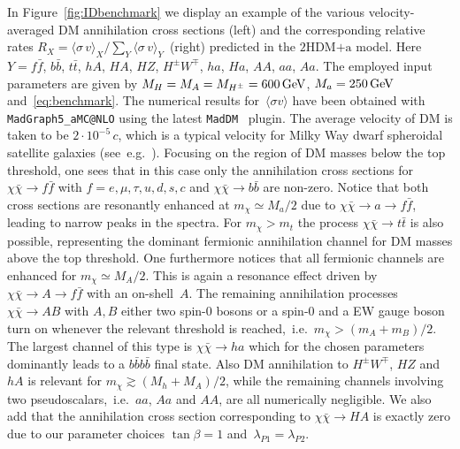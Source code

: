 \documentclass[a4paper, 11pt,notoc]{article}
\newcommand{\hdma}{\ensuremath{\textrm{2HDM+a}}\xspace}
\begin{document}
In  Figure~\ref{fig:IDbenchmark} we display  an example of the various velocity-averaged DM annihilation cross sections (left) and the corresponding relative rates $R_X = \langle \sigma \, v \rangle_X/\sum_Y \langle \sigma \, v \rangle_Y$~(right) predicted  in the \hdma model. Here $Y =  f \bar f$, $b \bar b$, $t \bar t$,  $hA$, $HA$, $HZ$,  $H^\pm W^\mp$, $ha$, $Ha$, $AA$, $aa$, $Aa$. The employed input parameters are given by $M_H = M_A = M_{H^\pm} = 600 \, {\rm GeV}$, $M_a = 250 \, {\rm GeV}$ and~\eqref{eq:benchmark}. The numerical results for~$\langle \sigma v \rangle$ have been obtained with {\tt MadGraph5\_aMC@NLO}  using the latest  {\tt MadDM}~\cite{Ambrogi:2018jqj} plugin.  The average velocity of DM is taken to be $2 \cdot 10^{-5} \, c$, which is a typical velocity for Milky Way dwarf spheroidal satellite galaxies (see~e.g.~\cite{Simon:2007dq,Walker:2008ax}). Focusing on the region of DM masses below the top threshold, one sees that in this case only the annihilation cross sections for $\chi \bar \chi \to f \bar f$ with $f = e, \mu, \tau, u, d, s, c$ and $\chi \bar \chi \to b \bar b$ are non-zero.   Notice that both cross sections are resonantly enhanced at $m_\chi \simeq M_a/2$ due to $\chi \bar \chi \to a \to f \bar f$, leading to narrow peaks in the spectra. For $m_\chi > m_t$ the process $\chi \bar \chi \to t \bar t$ is also possible, representing the dominant fermionic annihilation channel for DM masses above the top threshold. One furthermore notices that all fermionic channels are enhanced for $m_\chi \simeq M_A/2$. This is again a resonance effect driven  by $\chi \bar \chi \to A \to f \bar f$ with an on-shell~$A$. The remaining annihilation processes $\chi \bar \chi \to A B$ with $A,B$ either  two spin-0 bosons or a spin-0 and a EW gauge boson turn on whenever the relevant threshold is reached,~i.e.~$m_\chi > (m_A + m_B)/2$. The largest channel of this type is $\chi \bar \chi \to ha$ which for the chosen parameters dominantly leads to a $b \bar b b \bar b$ final state. Also DM annihilation to  $H^\pm W^\mp$, $HZ$ and $hA$ is relevant for $m_\chi \gtrsim (M_h + M_A)/2$, while the remaining channels involving two pseudoscalars,~i.e.~$aa$, $Aa$ and $AA$, are all numerically negligible. We also add that the annihilation cross section corresponding to $\chi \bar \chi \to HA$ is exactly zero due to our parameter choices  $\tan \beta = 1$ and~$\lambda_{P1} = \lambda_{P2}$.  
\end{document}
